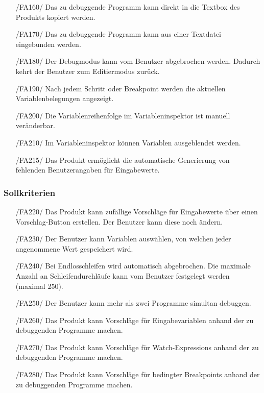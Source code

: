 \documentclass[parskip=full]{scrartcl}
\begin{document}
\begin{itemize}
		\item[/FA160/] Das zu debuggende Programm kann direkt in die Textbox des Produkts kopiert werden.
		\item[/FA170/] Das zu debuggende Programm kann aus einer Textdatei eingebunden werden.
		\item[/FA180/] Der \gls{Debugmodus} kann vom Benutzer abgebrochen werden. Dadurch kehrt der Benutzer zum \gls{Editiermodus} zurück.
		\item[/FA190/] Nach jedem Schritt oder \gls{Breakpoint} werden die aktuellen Variablenbelegungen angezeigt.
		\item[/FA200/] Die Variablenreihenfolge im Variableninspektor ist manuell veränderbar.
		\item[/FA210/] Im Variableninspektor können Variablen ausgeblendet werden.
		\item[/FA215/] Das Produkt ermöglicht die automatische Generierung von fehlenden Benutzerangaben für Eingabewerte.
		\end{itemize}

 		\subsubsection{Sollkriterien}
		\begin{itemize}
		\item[/FA220/] Das Produkt kann zufällige Vorschläge für Eingabewerte über einen Vorschlag-Button erstellen. Der Benutzer kann diese noch ändern.
		\item[/FA230/] Der Benutzer kann Variablen auswählen, von welchen jeder angenommene Wert gespeichert wird.
		\item[/FA240/] Bei Endlosschleifen wird automatisch abgebrochen. Die maximale Anzahl an Schleifendurchläufe kann vom Benutzer festgelegt werden (maximal 250).
		\item[/FA250/] Der Benutzer kann mehr als zwei Programme simultan debuggen.
		\item[/FA260/] Das Produkt kann Vorschläge für Eingabevariablen anhand der zu debuggenden Programme machen.
		\item[/FA270/] Das Produkt kann Vorschläge für \glspl{Watch-Expression} anhand der zu debuggenden Programme machen.
		\item[/FA280/] Das Produkt kann Vorschläge für \glspl{bedingter Breakpoint} anhand der zu debuggenden Programme machen.
		\end{itemize}
\end{document}
